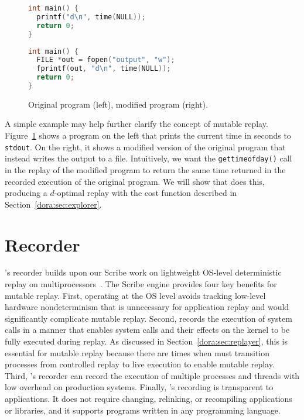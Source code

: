 \begin{figure}
\centering
\begin{minipage}{.8\textwidth}
\begin{minipage}{.5\textwidth}
\begin{lstlisting}[framexleftmargin=5pt,language=C]
int main() {
  printf("d\n", time(NULL));
  return 0;
}
\end{lstlisting}
\end{minipage}
\hspace{0.4in}
\begin{minipage}{.5\textwidth}
\begin{lstlisting}[framexleftmargin=5pt,language=C]
int main() {
  FILE *out = fopen("output", "w");
  fprintf(out, "d\n", time(NULL));
  return 0;
}
\end{lstlisting}
\end{minipage}
\end{minipage}
\caption{{Original program (left), modified program (right).}}
\label{dora:fig:code-example}
\end{figure}


A simple example may help further clarify the concept of
mutable replay.  Figure~\ref{dora:fig:code-example} shows a program on the left that
prints the current time in seconds to {\tt stdout}. On the right, it
shows a modified version of the original program that instead writes the output to a file.
Intuitively, we want the {\tt gettimeofday()} call in the replay of the
modified program to return the same time returned in the recorded
execution of the original program.
We will show that {\dora} does this, producing a $d$-optimal replay
with the cost function described in Section~\ref{dora:sec:explorer}. 

\section{Recorder}
\label{dora:sec:recorder}

{\dora}'s recorder builds upon our Scribe work on lightweight OS-level
deterministic replay on multiprocessors~\cite{scribe:sigmetrics10}.
The Scribe engine provides four key benefits for mutable replay. First, operating
at the OS level avoids tracking low-level hardware nondeterminism that
is unnecessary for application replay and would significantly
complicate mutable replay.  Second, {\dora} records the execution
of system calls in a manner that enables system calls and their effects
on the kernel to be fully executed during replay.  As discussed in
Section~\ref{dora:sec:replayer}, this is essential for mutable replay
because there are times when {\dora} must transition processes
from controlled replay to live execution to enable mutable replay.
Third, {\dora}'s recorder can record the execution of multiple
processes and threads with low overhead on production systems. Finally,
{\dora}'s recording is transparent to applications.  It does not
require changing, relinking, or recompiling applications or libraries,
and it supports programs written in any programming language.

